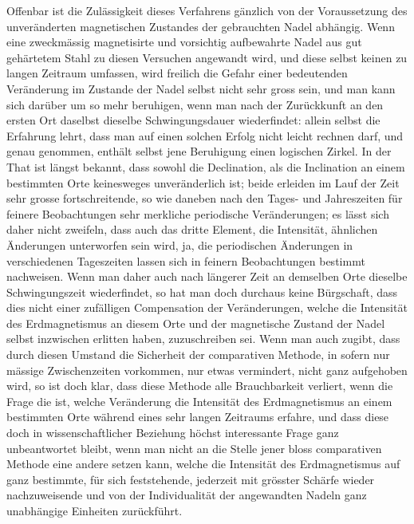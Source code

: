 Offenbar ist die Zulässigkeit dieses Verfahrens gänzlich von der Voraussetzung
des unveränderten magnetischen Zustandes der gebrauchten Nadel abhängig.
Wenn eine zweckmässig magnetisirte und vorsichtig aufbewahrte Nadel aus gut
gehärtetem Stahl zu diesen Versuchen angewandt wird, und diese selbst keinen
zu langen Zeitraum umfassen, wird freilich die Gefahr einer bedeutenden
Veränderung im Zustande der Nadel selbst nicht sehr gross sein, und man
kann sich darüber um so mehr beruhigen, wenn man nach der Zurückkunft an
den ersten Ort daselbst dieselbe Schwingungsdauer wiederfindet: allein selbst
die Erfahrung lehrt, dass man auf einen solchen Erfolg nicht leicht rechnen
darf, und genau genommen, enthält selbst jene Beruhigung einen logischen
Zirkel. In der That ist längst bekannt, dass sowohl die Declination, als die
Inclination an einem bestimmten Orte keinesweges unveränderlich ist; beide
erleiden im Lauf der Zeit sehr grosse fortschreitende, so wie daneben nach
den Tages- und Jahreszeiten
\clearpage
{}
\noindent
für feinere Beobachtungen sehr merkliche periodische Veränderungen; es lässt
sich daher nicht zweifeln, dass auch das dritte Element, die Intensität,
ähnlichen Änderungen unterworfen sein wird, ja, die periodischen Änderungen
in verschiedenen Tageszeiten lassen sich in feinern Beobachtungen bestimmt
nachweisen. Wenn man daher auch nach längerer Zeit an demselben Orte dieselbe
Schwingungszeit wiederfindet, so hat man doch durchaus keine Bürgschaft,
dass dies nicht einer zufälligen Compensation der Veränderungen, welche
die Intensität des Erdmagnetismus an diesem Orte und der magnetische Zustand
der Nadel selbst inzwischen erlitten haben, zuzuschreiben sei. Wenn man auch
zugibt, dass durch diesen Umstand die Sicherheit der comparativen Methode,
in sofern nur mässige Zwischenzeiten vorkommen, nur etwas vermindert, nicht
ganz aufgehoben wird, so ist doch klar, dass diese Methode alle Brauchbarkeit
verliert, wenn die Frage die ist, welche Veränderung die Intensität des
Erdmagnetismus an einem bestimmten Orte während eines sehr langen Zeitraums
erfahre, und dass diese doch in wissenschaftlicher Beziehung höchst
interessante Frage ganz unbeantwortet bleibt, wenn man nicht an die Stelle
jener bloss comparativen Methode eine andere setzen kann, welche die
Intensität des Erdmagnetismus auf ganz bestimmte, für sich feststehende,
jederzeit mit grösster Schärfe wieder nachzuweisende und von der Individualität
der angewandten Nadeln ganz unabhängige Einheiten zurückführt.

